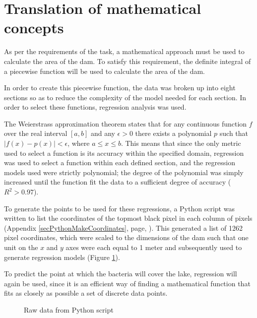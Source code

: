 \documentclass[a4paper]{article}
\theoremstyle{definition}
\begin{document}
\section{Translation of mathematical concepts}
    
    As per the requirements of the task, a mathematical approach must be used to calculate the area of the dam. To satisfy this requirement, the definite integral of a piecewise function will be used to calculate the area of the dam.

    In order to create this piecewise function, the data was broken up into eight sections so as to reduce the complexity of the model needed for each section. In order to select these functions, regression analysis was used.

    The Weierstrass approximation theorem states that for any continuous function $f$ over the real interval $[a, b]$ and any $\epsilon > 0$ there exists a polynomial $p$ such that $|f(x) - p(x)| < \epsilon$, where $a \leq x \leq b$. This means that since the only metric used to select a function is its accuracy within the specified domain, regression was used to select a function within each defined section, and the regression models used were strictly polynomial; the degree of the polynomial was simply increased until the function fit the data to a sufficient degree of accuracy ($R^2 > 0.97$).

    To generate the points to be used for these regressions, a Python script was written to list the coordinates of the topmost black pixel in each column of pixels (Appendix \ref{secPythonMakeCoordinates}, page, \pageref{secPythonMakeCoordinates}). This generated a list of 1262 pixel coordinates, which were scaled to the dimensions of the dam such that one unit on the $x$ and $y$ axes were each equal to 1 meter and subsequently used to generate regression models (Figure \ref{figRawData}).

    To predict the point at which the bacteria will cover the lake, regression will again be used, since it is an efficient way of finding a mathematical function that fits as closely as possible a set of discrete data points.

    \begin{figure} %
        \centering
        \caption{Raw data from Python script}
        \label{figRawData}
    \end{figure}
\end{document}

